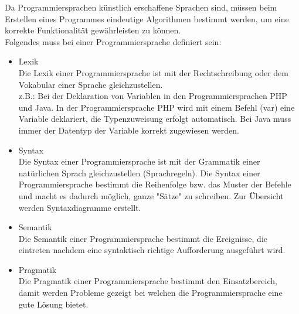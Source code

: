 \documentclass[12pt,a4paper]{report}
\begin{document}
\begin{onehalfspace}
Da Programmiersprachen künstlich erschaffene Sprachen sind, müssen beim Erstellen eines Programmes eindeutige Algorithmen bestimmt werden, um eine korrekte Funktionalität gewährleisten zu können.\\
Folgendes muss bei einer Programmiersprache definiert sein:

\begin{itemize}
\item Lexik\\
Die Lexik einer Programmiersprache ist mit der Rechtschreibung oder dem Vokabular einer Sprache gleichzustellen.\\
z.B.: Bei der Deklaration von Variablen in den Programmiersprachen PHP und Java. In der Programmiersprache PHP wird mit einem Befehl (var) eine Variable deklariert, die Typenzuweisung erfolgt automatisch. Bei Java muss immer der Datentyp der Variable korrekt zugewiesen werden.
\item Syntax\\
Die Syntax einer Programmiersprache ist mit der Grammatik einer natürlichen Sprach gleichzustellen (Sprachregeln).
Die Syntax einer Programmiersprache bestimmt die Reihenfolge bzw. das Muster der Befehle und macht es dadurch möglich, ganze "Sätze" zu schreiben. Zur Übersicht werden Syntaxdiagramme erstellt.
\item Semantik\\
Die Semantik einer Programmiersprache bestimmt die Ereignisse, die eintreten nachdem eine syntaktisch richtige Aufforderung ausgeführt wird.
\item Pragmatik\\
Die Pragmatik einer Programmiersprache bestimmt den Einsatzbereich, damit werden Probleme gezeigt bei welchen die Programmiersprache eine gute Lösung bietet.
\end{itemize}



\end{onehalfspace}
\end{document}
